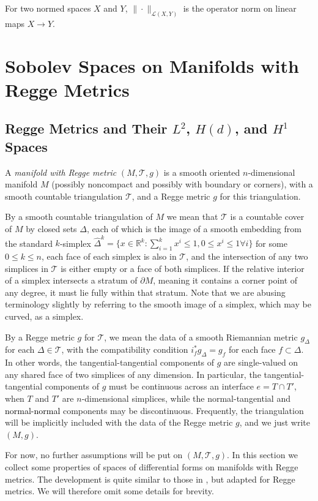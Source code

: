 \documentclass[11pt]{article}
\newcommand{\correction}[2]{\textcolor{red}{}\textcolor{black}{#2}}
\begin{document}
For two normed spaces $X$ and $Y$, $\|\cdot\|_{\mathcal{L}(X,Y)}$ is the operator norm on linear maps $X \to Y$.

\section{Sobolev Spaces on Manifolds with Regge Metrics}
\subsection{Regge Metrics and Their $L^2$, $H(d)$, and $H^1$ Spaces}
A \emph{manifold with Regge metric} $(M,\mathcal{T},g)$ is a smooth oriented $n$-dimensional manifold $M$ (possibly noncompact and possibly with boundary or corners), with a smooth countable triangulation $\mathcal{T}$, and a Regge metric $g$ for this triangulation. 

By a smooth countable triangulation of $M$ we mean that $\mathcal{T}$ is a countable cover of $M$ by closed sets $\Delta$, each of which is the image of a smooth embedding from the standard $k$-simplex $\hat\Delta^k = \{x \in \mathbb{R}^k: \sum_{i = 1}^k x^i \le 1, 0 \le x^i \le 1 \forall i\}$ for some $0 \le k \le n$, each face of each simplex is also in $\mathcal{T}$, and the intersection of any two simplices in $\mathcal{T}$ is either empty or a face of both simplices. If the relative interior of a simplex intersects a stratum of $\partial M$, meaning it contains a corner point of any degree, it must lie fully within that stratum. Note that we are abusing terminology slightly by referring to the smooth image of a simplex, which may be curved, as a simplex. 

By a Regge metric $g$ for $\mathcal{T}$, we mean the data of a smooth Riemannian metric $g_{\Delta}$ for each $\Delta \in \mathcal{T}$, with the compatibility condition $i_f^* g_{\Delta} = g_{f}$ for each face $f \subset \Delta$. In other words, the tangential-tangential components of $g$ are single-valued on any shared face of two simplices of any dimension. In particular, the tangential-tangential components of $g$ must be continuous across an interface $e = T \cap T'$, when $T$ and $T'$ are $n$-dimensional simplices, while the normal-tangential and \correction{tangential-tangential}{normal-normal} components may be discontinuous. Frequently, the triangulation will be implicitly included with the data of the Regge metric $g$, and we just write $(M,g)$.

For now, no further assumptions will be put on $(M,\mathcal{T},g)$. In this section we collect some properties of spaces of differential forms on manifolds with Regge metrics. The development is quite similar to those in \cite{Licht,Schwarz}, but adapted for Regge metrics. We will therefore omit some details for brevity.
\end{document}
